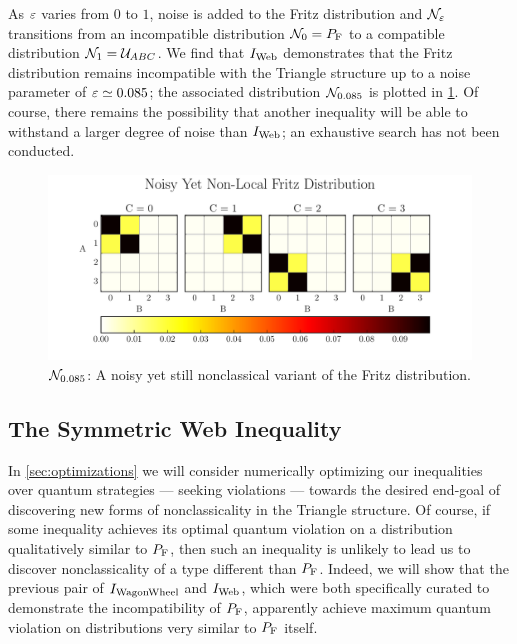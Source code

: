 \documentclass[aps, 10pt, english, twoside, pra, nofootinbib, tightenlines, longbibliography, superscriptaddress]{revtex4-1}
\begin{document}
    As $\varepsilon$ varies from $0$ to $1$, noise is added to the Fritz distribution and $\mathcal{N}_{\varepsilon}$ transitions from an incompatible distribution $\s{N}_{0} = \prob[\fritz]$ to a compatible distribution $\mathcal{N}_{1} = \mathcal{U}_{ABC}$. We find that $I_\text{Web}$ demonstrates that the Fritz distribution remains incompatible with the Triangle structure up to a noise parameter of $\varepsilon \simeq 0.085$; the associated distribution $\mathcal{N}_{0.085}$ is plotted in \cref{fig:noisy_fritz}. Of course, there remains the possibility that another inequality will be able to withstand a larger degree of noise than $I_\text{Web}$; an exhaustive search has not been conducted.

    \begin{figure}
    \begin{nscenter}
            \includegraphics{figure_noisy_yet_non_local_fritz.pdf}
            \caption{$\mathcal{N}_{0.085}$: A noisy yet still nonclassical variant of the Fritz distribution.}
            \label{fig:noisy_fritz}
    \end{nscenter}
    \end{figure}

    \subsection{The Symmetric Web Inequality}
    In \cref{sec:optimizations} we will consider numerically optimizing our inequalities over quantum strategies --- seeking violations --- towards the desired end-goal of discovering new forms of nonclassicality in the Triangle structure. Of course, if some inequality achieves its optimal quantum violation on a distribution qualitatively similar to $\prob[\fritz]$, then such an inequality is unlikely to lead us to discover nonclassicality of a type different than $\prob[\fritz]$. Indeed, we will show that the previous pair of $I_\text{WagonWheel}$ and $I_\text{Web}$, which were both specifically curated to demonstrate the incompatibility of $\prob[\fritz]$, apparently achieve maximum quantum violation on distributions very similar to $\prob[\fritz]$ itself.
\end{document}
